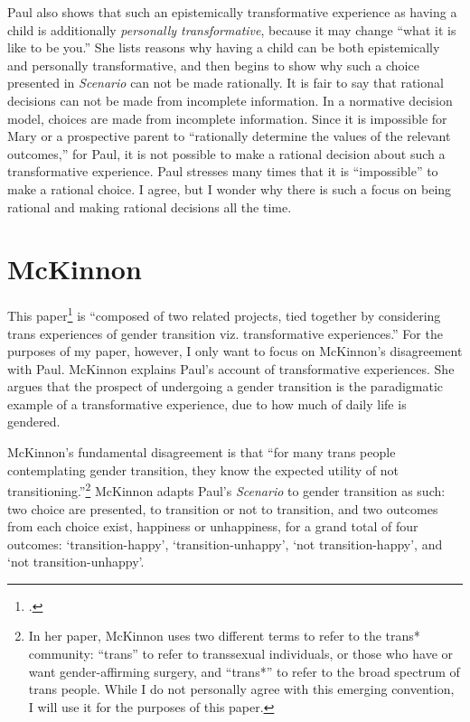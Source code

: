 \documentclass[12pt]{article}
\begin{document}
Paul also shows that such an epistemically transformative experience as having a child is
additionally \textit{personally transformative}, because it may change ``what it is like to be
you.'' She lists reasons why having a child can be both epistemically and personally transformative,
and then begins to show why such a choice presented in \textit{Scenario} can not be made rationally.
It is fair to say that rational decisions can not be made from incomplete information. In a
normative decision model, choices are made from incomplete information.  Since it is impossible
for Mary or a prospective parent to ``rationally determine the values of the relevant outcomes,''
for Paul, it is not possible to make a rational decision about such a transformative experience.
Paul stresses many times that it is ``impossible'' to make a rational choice. I agree, but I wonder
why there is such a focus on being rational and making rational decisions all the time. 

\section{McKinnon}

This paper\footcite{mckinnon_trans*formative_2015-1} is ``composed of two related projects, tied
together by considering trans experiences of gender transition viz. transformative experiences.''
For the purposes of my paper, however, I only want to focus on McKinnon's disagreement with Paul.
McKinnon explains Paul's account of transformative experiences. She argues that the prospect of
undergoing a gender transition is the paradigmatic example of a transformative experience, due to
how much of daily life is gendered. 

McKinnon's fundamental disagreement is that ``for many trans people contemplating gender transition,
they know the expected utility of not transitioning.''\footnote{In her paper, McKinnon uses two
different terms to refer to the trans* community: ``trans'' to refer to transsexual individuals, or
those who have or want gender-affirming surgery, and ``trans*'' to refer to the broad spectrum of
trans people. While I do not personally agree with this emerging convention, I will use it for the
purposes of this paper.} McKinnon adapts Paul's \textit{Scenario} to gender transition as such: two
choice are presented, to transition or not to transition, and two outcomes from each choice exist,
happiness or unhappiness, for a grand total of four outcomes: `transition-happy',
`transition-unhappy', `not transition-happy', and `not transition-unhappy'.
\end{document}
